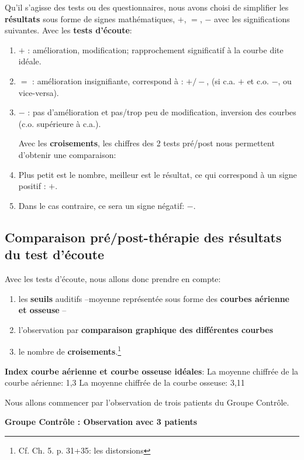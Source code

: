 Qu'il s'agisse des tests ou des questionnaires, nous avons choisi de
simplifier les \textbf{résultats} sous forme de signes
mathématiques, $+$, $=$, $-$ avec les significations suivantes.
Avec les \textbf{tests d'écoute}: 
\begin{enumerate}
\item$+$   : amélioration, modification;  rapprochement significatif à la courbe dite idéale.
\item$=$   : amélioration insignifiante, correspond à : $+/-$, (si c.a. $ + $ et c.o. $-$, ou vice-versa).

\item$-$   : pas d'amélioration et pas/trop peu  de modification, inversion
des courbes (c.o. supérieure à c.a.). 

  Avec les \textbf{croisements}, les chiffres des 2 tests pré/post
  nous permettent d'obtenir une comparaison: 
  \item Plus petit est le nombre, meilleur est le résultat, ce qui correspond à un signe positif : $+$.
\item Dans le
  cas contraire, ce sera un signe négatif: $-$.
  
\end{enumerate}


 \subsection{ Comparaison pré/post-thérapie des résultats du test d'écoute}
Avec les tests d'écoute, nous 
allons donc prendre en compte:

\begin{enumerate}
 \item   les \textbf{seuils} auditifs --moyenne
représentée sous forme des \textbf{courbes aérienne et osseuse} --
\item  l'observation par \textbf{comparaison graphique des différentes
  courbes}
\item le nombre de
\textbf{croisements}.\footnote{Cf. Ch. 5. p. 31+35: les distorsions}
 
\end{enumerate}


\textbf{Index courbe aérienne et courbe osseuse idéales}:
La moyenne chiffrée de la courbe aérienne: 1,3
La moyenne chiffrée de la courbe osseuse: 3,11


  Nous allons commencer par l'observation de trois patients du Groupe Contrôle.
     

      \textbf{Groupe Contrôle : Observation avec 3 patients}
